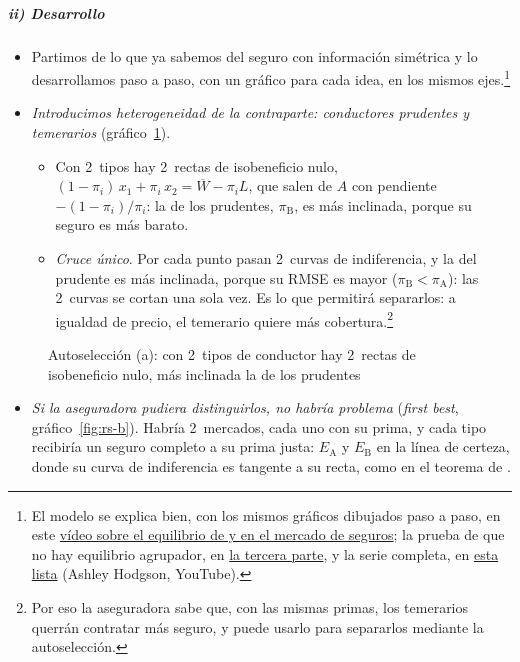 \documentclass[11pt]{article}
\begin{document}
\subparagraph{ii) Desarrollo}

\begin{itemize}
\item Partimos de lo que ya sabemos del seguro con información simétrica y lo desarrollamos paso a paso, con un gráfico para cada idea, en los mismos ejes.\footnote{El modelo se explica bien, con los mismos gráficos dibujados paso a paso, en este \href{https://youtu.be/surN9HrBppw?list=PLL6RiAl2WHXF8AxOf7UFr-cfHOAWGmhp0}{vídeo sobre el equilibrio de  y  en el mercado de seguros}; la prueba de que no hay equilibrio agrupador, en \href{https://youtu.be/U7NWx2bU0-U}{la tercera parte}, y la serie completa, en \href{https://www.youtube.com/playlist?list=PLL6RiAl2WHXF8AxOf7UFr-cfHOAWGmhp0}{esta lista} (Ashley Hodgson, YouTube).}
\item \emph{Introducimos heterogeneidad de la contraparte: conductores prudentes y temerarios} (gráfico~\ref{fig:rs-a}).
  \begin{itemize}
  \item Con 2~tipos hay 2~rectas de isobeneficio nulo, $(1-\pi_i)\,x_1+\pi_i\,x_2=\overline{W}-\pi_iL$, que salen de $A$ con pendiente $-(1-\pi_i)/\pi_i$: la de los prudentes, $\pi_{\mathrm{B}}$, es más inclinada, porque su seguro es más barato.
  \item \emph{Cruce único}. Por cada punto pasan 2~curvas de indiferencia, y la del prudente es más inclinada, porque su RMSE es mayor ($\pi_{\mathrm{B}}<\pi_{\mathrm{A}}$): las 2~curvas se cortan una sola vez. Es lo que permitirá separarlos: a igualdad de precio, el temerario quiere más cobertura.\footnote{Por eso la aseguradora sabe que, con las mismas primas, los temerarios querrán contratar más seguro, y puede usarlo para separarlos mediante la autoselección.}
  \end{itemize}
\end{itemize}

\begin{figure}[H]
\centering
\caption{Autoselección (a): con 2~tipos de conductor hay 2~rectas de isobeneficio nulo, más inclinada la de los prudentes}\label{fig:rs-a}
\end{figure}

\begin{itemize}
\item \emph{Si la aseguradora pudiera distinguirlos, no habría problema} (\emph{first best}, gráfico~\ref{fig:rs-b}). Habría 2~mercados, cada uno con su prima, y cada tipo recibiría un seguro completo a su prima justa: $E_{\mathrm{A}}$ y $E_{\mathrm{B}}$ en la línea de certeza, donde su curva de indiferencia es tangente a su recta, como en el teorema de .
\end{itemize}
\end{document}
